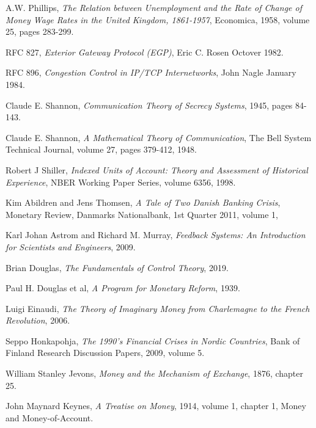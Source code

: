 \begin{thebibliography}{9}
    A.W. Phillips,
    \emph{The Relation between Unemployment and the Rate of Change of Money Wage Rates in the United Kingdom, 1861-1957},
    Economica,
    1958,
    volume 25,
    pages 283-299.


    RFC 827,
    \emph{Exterior Gateway Protocol (EGP)},
    Eric C. Rosen
    Octover 1982.

    RFC 896,
    \emph{Congestion Control in IP/TCP Internetworks},
    John Nagle
    January 1984.

    Claude E. Shannon,
    \emph{Communication Theory of Secrecy Systems},
    1945,
    pages 84-143.

    Claude E. Shannon,
    \emph{A Mathematical Theory of Communication},
    The Bell System Technical Journal,
    volume 27,
    pages 379-412,
    1948.

    Robert J Shiller,
    \emph{Indexed Units of Account: Theory and Assessment of Historical Experience},
    NBER Working Paper Series,
    volume 6356,
    1998.

    Kim Abildren and Jens Thomsen,
    \emph{A Tale of Two Danish Banking Crisis},
    Monetary Review,
    Danmarks Nationalbank,
    1st Quarter 2011,
    volume 1,

    Karl Johan Astrom and Richard M. Murray,
    \emph{Feedback Systems: An Introduction for Scientists and Engineers},
    2009.

    Brian Douglas,
    \emph{The Fundamentals of Control Theory},
    2019.

    Paul H. Douglas et al,
    \emph{A Program for Monetary Reform},
    1939.

    Luigi Einaudi,
    \emph{The Theory of Imaginary Money from Charlemagne to the French Revolution},
    2006.

    Seppo Honkapohja,
    \emph{The 1990's Financial Crises in Nordic Countries},
    Bank of Finland Research Discussion Papers,
    2009,
    volume 5.

    William Stanley Jevons,
    \emph{Money and the Mechanism of Exchange},
    1876,
    chapter 25.

    John Maynard Keynes,
    \emph{A Treatise on Money},
    1914,
    volume 1,
    chapter 1,
    Money and Money-of-Account.


\end{thebibliography}

